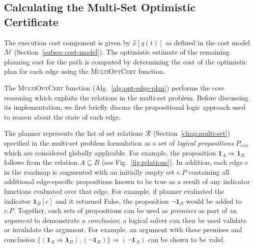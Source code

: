 \subsection{Calculating the Multi-Set Optimistic Certificate}
\label{subsec:alg-opt-path-cost}

The execution cost component is given by ${\hat x}[q(t)]$
as defined in the cost model $\mathcal{M}$
(Section~\ref{subsec:cost-model}).
The optimistic estimate of the remaining planning cost for the path
is computed by determining the cost of the optimistic plan for each
edge using the \textsc{MultiOptCert} function.

The \textsc{MultiOptCert} function (Alg.~\ref{alg:opt-edge-plan})
performs the core reasoning which exploits the relations in
the multi-set problem.
Before discussing its implementation,
we first briefly discuss the propositional logic approach
used to reason about the state of each edge.

The planner represents the list of set relations $\mathcal{R}$
(Section~\ref{chap:multi-set})
specified in the multi-set problem formulation
as a set of \emph{logical propositions} $P_{rels}$
which are considered globally applicable.
For example,
the proposition $\mathbf{1}_A \Rightarrow \mathbf{1}_B$
follows from the relation $A \subseteq B$
(see Fig.~\ref{fig:relations}).
In addition,
each edge $e$ in the roadmap is augmented with an initially empty
set $e.P$ containing all additional edge-specific propositions
known to be true as a result of any indicator functions evaluated
over that edge.
For example,
if planner evaluated the indicator $\mathbf{1}_B[e]$
and it returned False,
the proposition $\lnot\mathbf{1}_B$ would be added to $e.P$.
Together, such sets of propositions can be used as \emph{premises}
as part of an \emph{argument} to demonstrate a \emph{conclusion};
a logical solver can then be used validate or invalidate the argument.
For example, an argument with these premises and conclusion
$\{ (\mathbf{1}_A \Rightarrow \mathbf{1}_B), (\lnot\mathbf{1}_B) \}
\Rightarrow (\lnot\mathbf{1}_A)$
can be shown to be valid.

